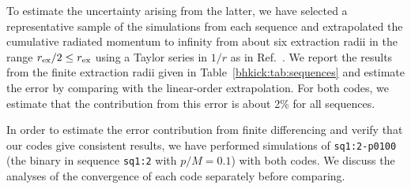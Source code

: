 To estimate the uncertainty arising from the latter, we have selected a
representative sample of the simulations from each sequence and extrapolated 
the cumulative radiated momentum to infinity from about six extraction
radii in the range $r_{\rm ex}/2 \le r_{\rm ex}$ 
using a Taylor series in $1/r$ as in 
Ref.~\cite{Sperhake:2011zz}. We report the results from the finite 
extraction radii given in Table~\ref{bhkick:tab:sequences} and estimate the 
error by comparing with the linear-order extrapolation.
For both codes, we estimate that the contribution from this error is about
2\% 
for all sequences.

In order to estimate the error contribution from finite differencing and
verify that our codes give consistent results, we have performed simulations
of \texttt{sq1:2-p0100} (the binary in sequence \texttt{sq1:2} with 
$p/M = 0.1$) with both codes. We discuss the analyses of the convergence
of each code separately before comparing.

